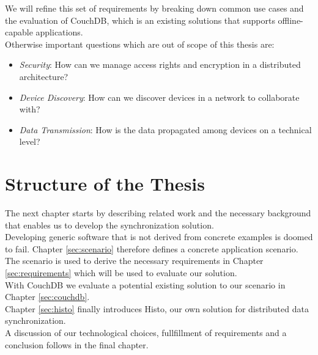 We will refine this set of requirements by breaking down common use cases and the evaluation of CouchDB, which is an existing solutions that supports offline-capable applications.\\

Otherwise important questions which are out of scope of this thesis are:

\begin{itemize}
\item \emph{Security}: How can we manage access rights and encryption in a distributed architecture?
\item \emph{Device Discovery}: How can we discover devices in a network to collaborate with?
\item \emph{Data Transmission}: How is the data propagated among devices on a technical level?
\end{itemize}

\section{Structure of the Thesis}
The next chapter starts by describing related work and the necessary background that enables us to develop the synchronization solution.\\
Developing generic software that is not derived from concrete examples is doomed to fail.
Chapter \ref{sec:scenario} therefore defines a concrete application scenario.\\
The scenario is used to derive the necessary requirements in Chapter \ref{sec:requirements} which will be used to evaluate our solution.\\
With CouchDB we evaluate a potential existing solution to our scenario in Chapter \ref{sec:couchdb}.\\
Chapter \ref{sec:histo} finally introduces Histo, our own solution for distributed data synchronization.\\
A discussion of our technological choices, fullfillment of requirements and a conclusion follows in the final chapter.
